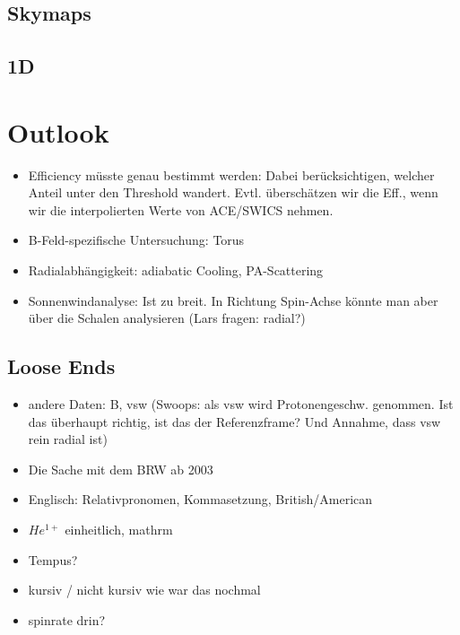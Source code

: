 \subsection{Skymaps}
\subsection{1D}



%
%
%
\section{Outlook}
\begin{itemize}
	\item Efficiency müsste genau bestimmt werden: Dabei berücksichtigen, welcher Anteil unter den Threshold wandert. Evtl. überschätzen wir die Eff., wenn wir die interpolierten Werte von ACE/SWICS nehmen.
	\item B-Feld-spezifische Untersuchung: Torus
	\item Radialabhängigkeit: adiabatic Cooling, PA-Scattering
	\item Sonnenwindanalyse: Ist zu breit. In Richtung Spin-Achse könnte man aber über die Schalen analysieren (Lars fragen: radial?)

\end{itemize}







\subsection{Loose Ends}
\begin{itemize}
	\item andere Daten: B, vsw (Swoops: als vsw wird Protonengeschw. genommen. Ist das überhaupt richtig, ist das der Referenzframe? Und Annahme, dass vsw rein radial ist)
	\item Die Sache mit dem BRW ab 2003
	\item Englisch: Relativpronomen, Kommasetzung, British/American
	\item $He^{1+}$ einheitlich, mathrm
	\item Tempus?
	\item kursiv / nicht kursiv wie war das nochmal
	\item spinrate drin?
\end{itemize}
